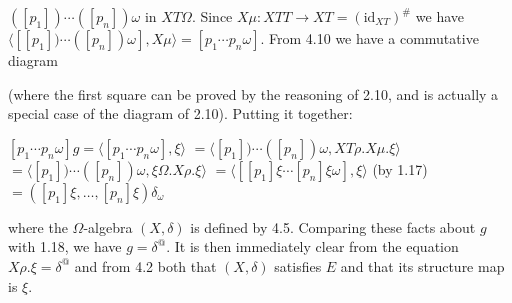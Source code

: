 $([p_1]) \cdots ([p_n]) \omega$ in $XT\Omega$. Since $X\mu: XTT \longrightarrow XT = (\text{id}_{XT})^\#$ we have $\langle [[p_1]) \cdots ([p_n]) \omega], X\mu \rangle = [p_1 \cdots p_n \omega]$. From 4.10 we have a commutative diagram

(where the first square can be proved by the reasoning of 2.10, and is actually a special case of the diagram of 2.10). Putting it together:

$[p_1 \cdots p_n \omega]g = \langle [p_1 \cdots p_n \omega], \xi \rangle$
$= \langle [p_1]) \cdots ([p_n]) \omega, XT\rho.X\mu.\xi \rangle$
$= \langle [p_1]) \cdots ([p_n]) \omega, \xi\Omega.X\rho.\xi \rangle$
$= \langle [[p_1]\xi \cdots [p_n]\xi \omega], \xi \rangle$ (by 1.17)
$= ([p_1]\xi, \ldots, [p_n]\xi)\delta_\omega$

where the $\Omega$-algebra $(X, \delta)$ is defined by 4.5. Comparing these facts about $g$ with 1.18, we have $g = \delta^@$. It is then immediately clear from the equation $X\rho.\xi = \delta^@$ and from 4.2 both that $(X, \delta)$ satisfies $E$ and that its structure map is $\xi$.